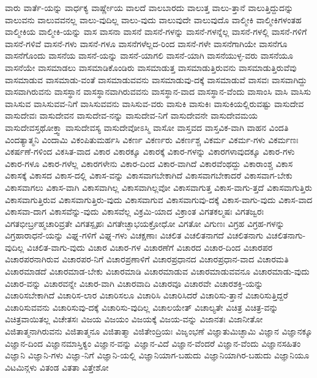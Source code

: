 {ವಾರು
ವಾರ್ತೆ-ಯನ್ನು
ವಾರ್ಧಕ್ಯ
ವಾರ್ಷ್ಣೇಯ
ವಾಲದೆ
ವಾಲಬಾರದು
ವಾಲುತ್ತ
ವಾಲು-ತ್ತಾನೆ
ವಾಲುತ್ತಿದ್ದುದನ್ನು
ವಾಲುವನು
ವಾಲುವವನಲ್ಲ
ವಾಲು-ವುದಿಲ್ಲ
ವಾಲು-ವುದು
ವಾಲುವುದೇ
ವಾಲುವುದೊ
ವಾಲ್ಮೀಕಿ
ವಾಲ್ಮೀಕಿಗಳಂತಹ
ವಾಲ್ಮೀಕಿಯ
ವಾಲ್ಮೀಕಿ-ಯನ್ನು
ವಾಸ
ವಾಸನಾ
ವಾಸನೆ
ವಾಸನೆ-ಗಳನ್ನು
ವಾಸನೆ-ಗಳನ್ನೆಲ್ಲ
ವಾಸನೆ-ಗಳಲ್ಲಿ
ವಾಸನೆ-ಗಳಿಗೆ
ವಾಸನೆ-ಗಳಿವೆ
ವಾಸನೆ-ಗಳು
ವಾಸನೆ-ಗಳೂ
ವಾಸನೆಗಳೆಲ್ಲದ-ರಿಂದ
ವಾಸನೆ-ಗಳೇ
ವಾಸನೆಗಾಗಿಯೇ
ವಾಸನೆಗೂ
ವಾಸನೆಗೊಂದು
ವಾಸನೆಯ
ವಾಸನೆ-ಯನ್ನು
ವಾಸನೆ-ಯಾಗಲಿ
ವಾಸನೆ-ಯಾಗಿ
ವಾಸನೆಯುಳ್ಳ-ವರು
ವಾಸನೆಯೂ
ವಾಸನೆಯೇ
ವಾಸಮಾಡಲು
ವಾಸಮಾಡಿಕೊಂಡಿರು
ವಾಸಮಾಡುತ್ತ
ವಾಸಮಾಡುತ್ತಿರುವನು
ವಾಸಮಾಡುತ್ತಿರುವೆವು
ವಾಸಮಾಡುವ
ವಾಸಮಾಡು-ವಂತೆ
ವಾಸಮಾಡುವವನು
ವಾಸಮಾಡುವು-ದಕ್ಕೆ
ವಾಸಮಾಡುವೆ
ವಾಸವಃ
ವಾಸವಾಗಿದ್ದು
ವಾಸವಾಗಿರುವನು
ವಾಸಸ್ಥಾನ
ವಾಸಸ್ಥಾನವಾಗಿರುವವನು
ವಾಸಸ್ಥಾನ-ವಾದ
ವಾಸಸ್ಥಾನ-ವೆಂದು
ವಾಸಾಂಸಿ
ವಾಸಿ
ವಾಸಿಸು
ವಾಸಿಸುವ
ವಾಸಿಸುವವ-ನಿಗೆ
ವಾಸಿಸುವವನು
ವಾಸಿಸುವ-ವರು
ವಾಸುಕಿ
ವಾಸುಕಿಃ
ವಾಸುಕಿಯಲ್ಲಿರುವಷ್ಟು
ವಾಸುದೇವ
ವಾಸುದೇವಃ
ವಾಸುದೇವನ
ವಾಸುದೇವ-ನನ್ನು
ವಾಸುದೇವ-ನಿಗೆ
ವಾಸುದೇವನೇ
ವಾಸುದೇವಮಯ
ವಾಸುದೇವಸ್ತಥೋಕ್ತ್ವಾ
ವಾಸುದೇವಸ್ಯ
ವಾಸುದೇವೋಽಸ್ಮಿ
ವಾಸೋ
ವಾಸ್ತವದ
ವಾಸ್ತವಿಕ-ವಾಗಿ
ವಾಹನ
ವಿಂದತಿ
ವಿಂದತ್ಯಾತ್ಮನಿ
ವಿಂದಾಮಿ
ವಿಕಂಪಿತುಮರ್ಹಸಿ
ವಿಕರ್ಣ
ವಿಕರ್ಣರು
ವಿಕರ್ಣಶ್ಚ
ವಿಕರ್ಮ
ವಿಕರ್ಮ-ಗಳು
ವಿಕರ್ಮಣಃ
ವಿಕರ್ಷಣೆ-ಗಳಿಂದ
ವಿಕಸಿತ-ವಾದ
ವಿಕಾರ
ವಿಕಾರಕ್ಕೂ
ವಿಕಾರಕ್ಕೆ
ವಿಕಾರ-ಗಳನ್ನು
ವಿಕಾರಗಳಾವುದಕ್ಕೂ
ವಿಕಾರ-ಗಳು
ವಿಕಾರ-ಗಳೂ
ವಿಕಾರ-ಗಳೆಲ್ಲ
ವಿಕಾರಗಳೇನು
ವಿಕಾರ-ದಿಂದ
ವಿಕಾರ-ವಾಗಿದೆ
ವಿಕಾರವೆಂಥದ್ದು
ವಿಕಾರಾಂಶ್ಚ
ವಿಕಾಸ
ವಿಕಾಸಕ್ಕೆ
ವಿಕಾಸದ
ವಿಕಾಸ-ದಲ್ಲಿ
ವಿಕಾಸ-ವನ್ನು
ವಿಕಾಸವಾಗಬೇಕಾಗಿದೆ
ವಿಕಾಸವಾಗಬೇಕಾದರೆ
ವಿಕಾಸವಾಗ-ಬೇಕು
ವಿಕಾಸವಾಗಲು
ವಿಕಾಸ-ವಾಗಿ
ವಿಕಾಸವಾಗಿಲ್ಲ
ವಿಕಾಸವಾಗಿಲ್ಲವೋ
ವಿಕಾಸವಾಗುತ್ತ
ವಿಕಾಸ-ವಾಗು-ತ್ತದೆ
ವಿಕಾಸವಾಗುತ್ತಿರು
ವಿಕಾಸವಾಗುತ್ತಿರುವ
ವಿಕಾಸವಾಗುತ್ತಿರು-ವುದು
ವಿಕಾಸವಾಗುವ
ವಿಕಾಸವಾಗುವು-ದಕ್ಕೆ
ವಿಕಾಸ-ವಾಗು-ವುದು
ವಿಕಾಸ-ವಾದ
ವಿಕಾಸವಾ-ದಾಗ
ವಿಕಾಸವೆನ್ನು-ವುದು
ವಿಕಾಸವೆಲ್ಲ
ವಿಕ್ರಮಿ-ಯಾದ
ವಿಕ್ರಾಂತ
ವಿಗತಕಲ್ಮಷಃ
ವಿಗತಜ್ವರಃ
ವಿಗತಭೀರ್ಬ್ರಹ್ಮಚಾರಿವ್ರತೇ
ವಿಗತಸ್ಪೃಹಃ
ವಿಗತೇಚ್ಛಾಭಯಕ್ರೋಧೋ
ವಿಗತೋ
ವಿಗುಣಃ
ವಿಗ್ರಹ
ವಿಗ್ರಹ-ಗಳನ್ನು
ವಿಗ್ರಹಾರಾಧನೆ-ಯನ್ನು
ವಿಘ್ನ-ಗಳಿಗೆ
ವಿಘ್ನ-ಗಳು
ವಿಚಕ್ಷಣಾಃ
ವಿಚಲಿತ
ವಿಚಲಿತನಾಗದೆ
ವಿಚಲಿತನಾಗು
ವಿಚಲಿತನಾಗು-ವುದಿಲ್ಲ
ವಿಚಲಿತ-ವಾಗು-ವುದು
ವಿಚಾರ
ವಿಚಾರ-ಗಳ
ವಿಚಾರಣೆಗೆ
ವಿಚಾರದ
ವಿಚಾರ-ದಿಂದ
ವಿಚಾರಪರ
ವಿಚಾರಪರನಾಗಿರುವ
ವಿಚಾರಪರ-ನಿಗೆ
ವಿಚಾರಪ್ರಣಾಳಿಗೆ
ವಿಚಾರಪ್ರಧಾನದ
ವಿಚಾರಪ್ರಧಾನ-ವಾದ
ವಿಚಾರಮತಿ
ವಿಚಾರಮಾಡದೆ
ವಿಚಾರಮಾಡ-ಬೇಕು
ವಿಚಾರಮಾಡಿ
ವಿಚಾರಮಾಡುವ
ವಿಚಾರಮಾಡುವವನೂ
ವಿಚಾರಮಾಡು-ವುದು
ವಿಚಾರ-ವನ್ನು
ವಿಚಾರವನ್ನೇ
ವಿಚಾರ-ವಾಗಿ
ವಿಚಾರವಾದಿ
ವಿಚಾರವೂ
ವಿಚಾರವೇ
ವಿಚಾರಶಕ್ತಿ-ಯನ್ನು
ವಿಚಾರಿಸಬೇಕಾಗಿದೆ
ವಿಚಾರಿಸ-ಲಾರ
ವಿಚಾರಿಸಲೂ
ವಿಚಾರಿಸಿ
ವಿಚಾರಿಸಿದರೆ
ವಿಚಾರಿಸು-ತ್ತಾನೆ
ವಿಚಾರಿಸುತ್ತಿದ್ದರೆ
ವಿಚಾರಿಸುವವನು
ವಿಚಾರಿಸುವು-ದಕ್ಕೆ
ವಿಚಾರಿಸು-ವುದಿಲ್ಲ
ವಿಚಾಲಯೇತ್
ವಿಚಾಲ್ಯತೇ
ವಿಚಿತ್ರ
ವಿಚಿತ್ರ-ವನ್ನು
ವಿಚಿತ್ರವಾಯಿತಲ್ಲ
ವಿಚೇತಸಃ
ವಿಜಯ
ವಿಜಯಂ
ವಿಜಯಕ್ಕೆ
ವಿಜಯ-ವನ್ನು
ವಿಜಾನತಃ
ವಿಜಾನೀತೋ
ವಿಜಿತಾತ್ಮನಾಗಿರುವನು
ವಿಜಿತಾತ್ಮನೂ
ವಿಜಿತಾತ್ಮಾ
ವಿಜಿತೇಂದ್ರಿಯಃ
ವಿಜೃಂಭಣೆ
ವಿಜ್ಞಾತುಮಿಚ್ಛಾಮಿ
ವಿಜ್ಞಾನ
ವಿಜ್ಞಾನಕ್ಕೂ
ವಿಜ್ಞಾನ-ದಿಂದ
ವಿಜ್ಞಾನಮಾಸ್ತಿಕ್ಯಂ
ವಿಜ್ಞಾನ-ವನ್ನು
ವಿಜ್ಞಾನ-ವಿದೆ
ವಿಜ್ಞಾನ-ವೆಂದರೆ
ವಿಜ್ಞಾನ-ವೆಂದು
ವಿಜ್ಞಾನಸಹಿತಂ
ವಿಜ್ಞಾನಿ
ವಿಜ್ಞಾನಿ-ಗಳು
ವಿಜ್ಞಾ-ನಿಗೆ
ವಿಜ್ಞಾನಿ-ಯಲ್ಲಿ
ವಿಜ್ಞಾನಿಯಾಗ-ಬಹುದು
ವಿಜ್ಞಾನಿಯಾಗಿರ-ಬಹುದು
ವಿಜ್ಞಾನಿಯೂ
ವಿಟಮಿನ್ಗಳು
ವಿತಂಡ
ವಿತತಾ
ವಿತ್ತೇಶೋ
}
